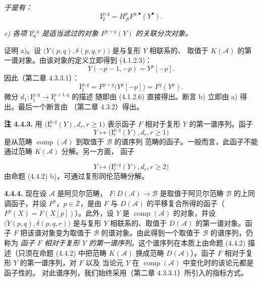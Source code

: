 \clearpage
{}%
\begingroup\small\setlength{\parskip}{0pt}\setlength{\emergencystretch}{1.5em}
\setlength{\abovedisplayskip}{4pt plus 2pt minus 2pt}%
\setlength{\belowdisplayskip}{4pt plus 2pt minus 2pt}%

\noindent\textit{于是有：}
\[
\mathrm I_2^{p,q}=H_{\mathcal B}^pF^{q,\bullet}(Y^\bullet).
\]

\noindent\textit{c) 各项 $\mathrm I_\infty^{p,q}$ 是适当滤过的对象
$F^{p+q}(Y)$ 的关联分次对象。}

证明 a)。设 $\bigl(Y(p,q),\delta(p,q,r)\bigr)$ 是与复形 $Y$ 相联系的、
取值于 $K(\mathcal A)$ 的第一谱对象。由该对象的定义立即得到
(4.1.2.3)：
\[
Y(-p-1,-p)=Y^p[-p].
\]
因此（第二章 4.3.3.1）：
\[
\mathrm I_1^{p,q}=F^{p+q}\bigl(Y^p[-p]\bigr)=F^q(Y^p).
\]
微分 $d_1\colon\mathrm I_1^{p,q}\longrightarrow\mathrm I_1^{p+1,q}$ 的描述
随即由 (4.1.2.6) 直接得出。断言 b) 立即由 a) 得出。最后一个断言由
（第二章 4.3.2）得出。

\medskip\noindent\textbf{注 4.4.3.}\quad
用 $\bigl(\mathrm I_r^{p,q}(Y),d_r,r\geq1\bigr)$ 表示函子 $F$ 相对于复形
$Y$ 的第一谱序列。函子
\[
Y\longmapsto\bigl(\mathrm I_r^{p,q}(Y),d_r,r\geq1\bigr)
\]
是从范畴 $\operatorname{comp}(\mathcal A)$ 到取值于 $\mathcal B$ 的谱序列
范畴的函子。一般而言，此函子不能通过范畴 $K(\mathcal A)$ 分解。另一方面，
函子

\[
Y\longmapsto\bigl(\mathrm I_r^{p,q}(Y),d_r,r\geq2\bigr)
\]
由命题 (4.4.2) b)，可通过复形同伦范畴分解。

\medskip\noindent\textbf{4.4.4.}\quad
现在设 $\mathcal A$ 是阿贝尔范畴，
$F\colon D(\mathcal A)\longrightarrow\mathcal B$ 是取值于阿贝尔范畴
$\mathcal B$ 的上同调函子，并设 $F^p$，$p\in\mathbb Z$，是由 $F$ 与
$D(\mathcal A)$ 的平移复合所得的函子（$F^p(X)=F(X[p])$）。此外，设 $Y$
是 $\operatorname{comp}(\mathcal A)$ 的对象，并设
$\bigl(Y(p,q),\delta(p,q,r)\bigr)$ 是与复形 $Y$ 相联系的、取值于
$D(\mathcal A)$ 的第一谱对象。函子 $F$ 把该谱对象变为取值于
$\mathcal B$ 的谱对象。由此得到一个取值于 $\mathcal B$ 的谱序列，仍称为
\emph{函子 $F$ 相对于复形 $Y$ 的第一谱序列}。这个谱序列在本质上由命题
(4.4.2) 描述（只须在命题 (4.4.2) 中把范畴 $K(\mathcal A)$ 换成范畴
$D(\mathcal A)$）。函子 $F$ 相对于复形 $Y$ 的第一谱序列，对 $F$ 以及
当论元 $Y$ 在 $\operatorname{comp}(\mathcal A)$ 中变化时的该论元都是函子性的。
对此谱序列，我们始终采用（第二章 4.3.3.1）所引入的指标方式。
\endgroup
